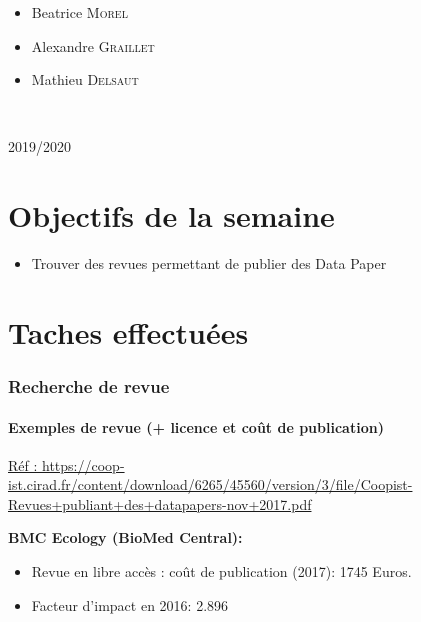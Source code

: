 \documentclass[11pt,oneside]{article}
\begin{document}
\begin{titlepage}
\begin{minipage}{0.45\textwidth}
\begin{flushright}
\begin{itemize}[font=\color{amber} \Large, label=, leftmargin=3.5cm]
\item{Beatrice \textsc{Morel}}
\item{Alexandre \textsc{Graillet}}
\item{Mathieu \textsc{Delsaut}}
\end{itemize}

\end{flushright}
\end{minipage}\\[0cm]
\vspace{10cm} 
\begin{center}
2019/2020
\end{center}
\vfill
\end{titlepage}


\newpage
\part*{Objectifs de la semaine}
\begin{itemize}
	\item Trouver des revues permettant de publier des Data Paper
\end{itemize}



\part*{Taches effectuées}
\section*{Recherche de revue}
\subsection*{Exemples de revue (+ licence et coût de publication)}

\begin{flushleft}
\url{Réf : https://coop-ist.cirad.fr/content/download/6265/45560/version/3/file/Coopist-Revues+publiant+des+datapapers-nov+2017.pdf}\hypersetup {colorlinks=true,linkcolor=blue,urlcolor=blue}
\end{flushleft}

\begin{flushleft}
\textbf{BMC Ecology (BioMed Central):}
\end{flushleft}
\begin{itemize} [font=\color{blue} \Large, label=, leftmargin=3.5cm]
\item Revue en libre accès : coût de publication (2017): 1745 Euros.
\item Facteur d'impact en 2016: 2.896
\end{itemize}
\end{document}
